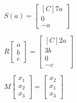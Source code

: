 \begin{exercise}
\begin{inparaenum}[a)]
\item $S(a)=\begin{bmatrix*}[C] 7a \\ 0 \\ -a \end{bmatrix*}$ \hfill {} \\
\item $R\begin{bmatrix}a \\ b \\ c \end{bmatrix} =\begin{bmatrix*}[C] 2a \\ 3b \\ 0 \\ -c \end{bmatrix*}$ \hfill
\item $M \begin{bmatrix}x_1\\ x_2 \\ x_3\end{bmatrix}=\begin{bmatrix}x_2\\ x_1 \\ x_3\end{bmatrix}$ \hfill {} \\
\end{inparaenum}
\end{exercise}